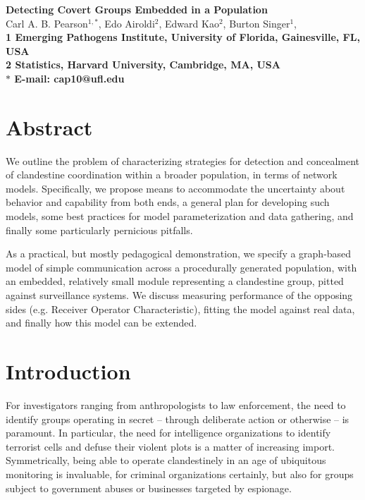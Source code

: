 \documentclass{article}
\newcommand{\todoCP}[1]{\todo{CP, #1}}
\begin{document}

\begin{flushleft}
{\Large
\textbf{Detecting Covert Groups Embedded in a Population}
}
\\
Carl A. B. Pearson$^{1,\ast}$, 
Edo Airoldi$^{2}$, 
Edward Kao$^{2}$,
Burton Singer$^{1}$, 
\\
\bf{1} Emerging Pathogens Institute, University of Florida, Gainesville, FL, USA
\\
\bf{2} Statistics, Harvard University, Cambridge, MA, USA
\\
$\ast$ E-mail: cap10@ufl.edu
\end{flushleft}
\section*{Abstract}
We outline the problem of characterizing strategies for detection and concealment of clandestine coordination within a broader population, in terms of network models.  Specifically, we propose means to accommodate the uncertainty about behavior and capability from both ends, a general plan for developing such models, some best practices for model parameterization and data gathering, and finally some particularly pernicious pitfalls.

As a practical, but mostly pedagogical demonstration, we specify a graph-based model of simple communication across a procedurally generated population, with an embedded, relatively small module representing a clandestine group, pitted against surveillance systems.  We discuss measuring performance of the opposing sides (e.g. Receiver Operator Characteristic), fitting the model against real data, and finally how this model can be extended.


\newpage

\section*{Introduction}
For investigators ranging from anthropologists to law enforcement, the need to identify groups operating in secret -- through deliberate action or otherwise -- is paramount.  In particular, the need for intelligence organizations to identify terrorist cells and defuse their violent plots is a matter of increasing import.  Symmetrically, being able to operate clandestinely in an age of ubiquitous monitoring is invaluable, for criminal organizations certainly, but also for groups subject to government abuses or businesses targeted by espionage.
\end{document}
